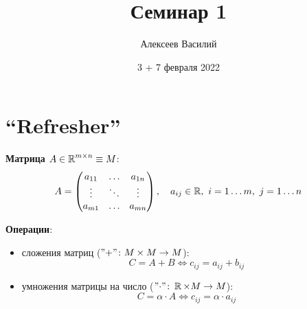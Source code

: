 \documentclass[a4paper,12pt]{article}
\author{Алексеев Василий}
\title{Семинар 1}
\date{3 + 7 февраля 2022}
\begin{document}
  \maketitle
  
  \tableofcontents

  \thispagestyle{empty}
  
  \newpage
  

  \section{``Refresher''}
    \noindent
    
    \textbf{Матрица} $A \in \operatorname{\mathbb R}^{m \times n} \equiv M$:
    \[
      A = \begin{pmatrix}
        a_{11} & \ldots & a_{1n}\\
        \vdots & \ddots & \vdots\\
        a_{m1} & \ldots & a_{mn}
      \end{pmatrix}, \quad a_{ij} \in \operatorname{\mathbb R},\ i = 1 \ldots m,\ j = 1 \ldots n
    \]
    
    \textbf{Операции}:
    \begin{itemize}
      \item сложения матриц ($"{+}"\colon M \hm\times M \hm\to M$):
      \[
        C = A + B \Leftrightarrow c_{ij} = a_{ij} + b_{ij}
      \]
      
      \item умножения матрицы на число ($"{\cdot}"\colon \RR \hm\times M \hm\to M$):
      \[
        C = \alpha \cdot A \Leftrightarrow c_{ij} = \alpha \cdot a_{ij}
      \]
    \end{itemize}
    
\end{document}
